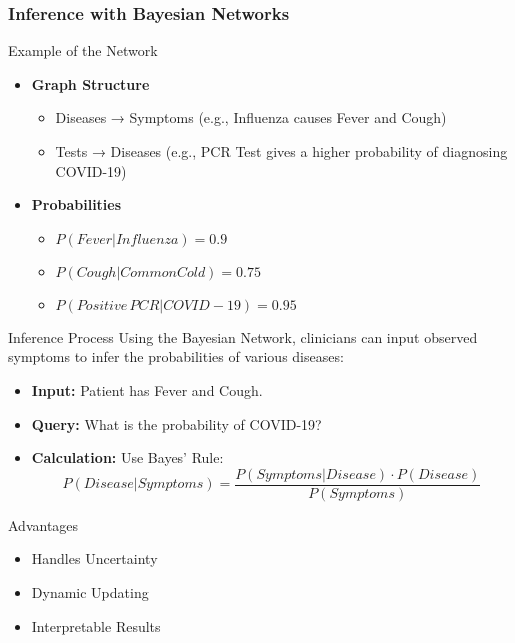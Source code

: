 \documentclass[aspectratio=169]{beamer}
\begin{document}
\begin{frame}[fragile]
    \frametitle{Inference with Bayesian Networks}
    \begin{block}{Example of the Network}
        \begin{itemize}
            \item \textbf{Graph Structure}
            \begin{itemize}
                \item Diseases → Symptoms (e.g., Influenza causes Fever and Cough)
                \item Tests → Diseases (e.g., PCR Test gives a higher probability of diagnosing COVID-19)
            \end{itemize}
            
            \item \textbf{Probabilities}
            \begin{itemize}
                \item \( P(Fever | Influenza) = 0.9 \)
                \item \( P(Cough | Common Cold) = 0.75 \)
                \item \( P(Positive\, PCR | COVID-19) = 0.95 \)
            \end{itemize}
        \end{itemize}
        
        \begin{block}{Inference Process}
            Using the Bayesian Network, clinicians can input observed symptoms to infer the probabilities of various diseases:
            \begin{itemize}
                \item \textbf{Input:} Patient has Fever and Cough.
                \item \textbf{Query:} What is the probability of COVID-19?
                \item \textbf{Calculation:} Use Bayes' Rule:
                \begin{equation}
                    P(Disease | Symptoms) = \frac{P(Symptoms | Disease) \cdot P(Disease)}{P(Symptoms)}
                \end{equation}
            \end{itemize}
        \end{block}
        
        \begin{block}{Advantages}
            \begin{itemize}
                \item Handles Uncertainty
                \item Dynamic Updating
                \item Interpretable Results
            \end{itemize}
        \end{block}
    \end{block}
\end{frame}
\end{document}
